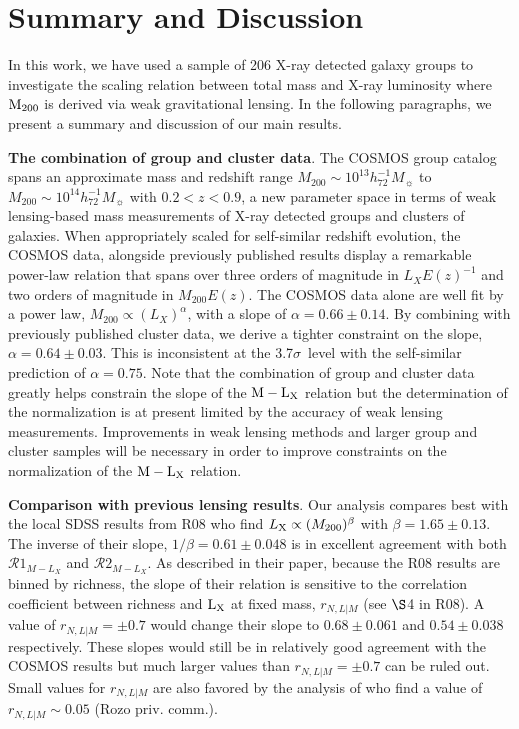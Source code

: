 \documentclass[12pt]{emulateapj}
\newcommand{\ngroup}{206 }      %
\newcommand{\mlx}{$\rm{M} - \rm{L}_{\rm X}$ }
\newcommand{\lx}{$\rm{L}_{\rm X}$ }
\newcommand{\mass}{h_{72}^{-1} M_{\sun}}
\newcommand{\cosalpha}{$\alpha=0.66 \pm 0.14$}   %
\newcommand{\henkalpha}{$\alpha=0.64 \pm 0.03$}
\newcommand{\sssig}{3.7$\sigma$}
\begin{document}

\section{Summary and Discussion}\label{discussion}

In this work, we have used a sample of \ngroup X-ray detected galaxy
groups to investigate the scaling relation between total mass and
X-ray luminosity where ${\rm M}_{\rm 200}$ is derived via weak
gravitational lensing. In the following paragraphs, we present a
summary and discussion of our main results.  \vspace{0.05 in}

{\bf The combination of group and cluster data}. The COSMOS group
catalog spans an approximate mass and redshift range $M_{200} \sim
10^{13} \mass$ to $M_{200} \sim 10^{14} \mass$ with $0.2 < z < 0.9$, a
new parameter space in terms of weak lensing-based mass measurements
of X-ray detected groups and clusters of galaxies. When appropriately
scaled for self-similar redshift evolution, the COSMOS data, alongside
previously published results display a remarkable power-law relation
that spans over three orders of magnitude in $L_X E(z)^{-1}$ and two
orders of magnitude in $M_{200}E(z)$. The COSMOS data alone are well
fit by a power law, $M_{200} \propto (L_{X})^{\alpha}$, with a slope
of \cosalpha. By combining with previously published cluster data, we
derive a tighter constraint on the slope, \henkalpha. This is
inconsistent at the \sssig\ level with the self-similar prediction of
$\alpha=0.75$.  Note that the combination of group and cluster data
greatly helps constrain the slope of the \mlx relation but the
determination of the normalization is at present limited by the
accuracy of weak lensing measurements. Improvements in weak lensing
methods and larger group and cluster samples will be necessary in
order to improve constraints on the normalization of the \mlx
relation.\vspace{0.05 in}

{\bf Comparison with previous lensing results}. Our analysis compares
best with the local SDSS results from R08 who find $L_{\rm X} \propto
(M_{200})^{\beta}$ with $\beta=1.65 \pm 0.13$. The inverse of their
slope, $1/\beta = 0.61 \pm 0.048$ is in excellent agreement with both
$\mathcal{R}1_{M-L_{X}}$ and $\mathcal{R}2_{M-L_{X}}$. As described in
their paper, because the R08 results are binned by richness, the slope
of their relation is sensitive to the correlation coefficient between
richness and \lx at fixed mass, $r_{N,L|M}$ (see $\S$4 in R08). A
value of $r_{N,L|M}=\pm 0.7$ would change their slope to $0.68 \pm
0.061$ and $0.54\pm 0.038$ respectively. These slopes would still be
in relatively good agreement with the COSMOS results but much larger
values than $r_{N,L|M}=\pm 0.7$ can be ruled out. Small values for
$r_{N,L|M}$ are also favored by the analysis of \citet[][]{Rozo:2008}
who find a value of $r_{N,L|M} \sim 0.05$ (Rozo priv. comm.).
\end{document}
